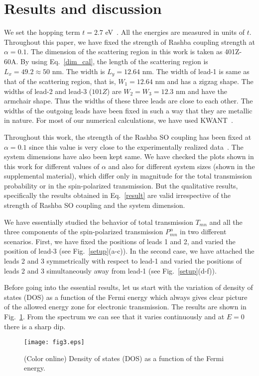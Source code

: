 \documentclass[prb,aps,twocolumn,amsmath,amssymb,floatfix,
superscriptaddress]{revtex4}
\begin{document}
\section{{\label{randd}}Results and discussion}

We set the hopping term $t=2.7$ eV~{\cite{neto}}. All the
energies are measured in units of $t$. Throughout this paper, we have
fixed the strength of Rashba coupling strength at $\alpha=0.1$. The
dimension of the scattering region in this work is taken as
401Z-60A. By using Eq.~\ref{dim_cal}, the length of the scattering
region is $L_x =49.2\approx 50$ nm. The width is $L_y=12.64$ nm. The
width of lead-1 is same as that of the scattering region, that is,
$W_1=12.64$ nm and has a zigzag shape. The widths of lead-2 and lead-3
($101Z$) are $W_2=W_3=12.3$ nm and have the armchair shape. Thus the
widths of these three leads are close to each other. The widths of the
outgoing leads have been fixed in such a way that they are metallic in
nature. For most of our numerical calculations, we have used
KWANT~\cite{kwant}.

Throughout this work, the strength of the Rashba SO coupling has been
fixed at $\alpha=0.1$ since this value is very close to the
experimentally realized data~{\cite{dedcov}}. The system dimensions have
also been kept same. We have checked the plots shown in this work for
different values of $\alpha$ and also for different system sizes
(shown in the supplemental material), which differ only in
magnitude for the total transmission probability or in the
spin-polarized transmission. But the qualitative results, specifically
the results obtained in Eq.~{\ref{result}} are valid irrespective of the
strength of Rashba SO coupling and the system dimension.

We have essentially studied the behavior of total transmission $T_{mn}$ and all
the three components of the spin-polarized transmission
$P^\alpha_{mn}$ in two different scenarios. First, we have fixed the
positions of leads 1 and 2, and varied the position of lead-3 (see
Fig.~\ref{setup}(a-c)). In the second case, we have attached the leads
2 and 3 symmetrically with respect to lead-1 and varied the positions
of leads 2 and 3 simultaneously away from lead-1 (see
Fig.~\ref{setup}(d-f)).

Before going into the essential results, let us start with the
  variation of density of states (DOS) as a function of the Fermi
  energy which always gives clear picture of the allowed energy zone for electronic transmission. The results are shown in Fig.~{\ref{dos}}. From the spectrum
  we can see that it varies continuously and at $E=0$ there is a sharp
  dip.
\begin{figure}[h]
\centering
\texttt{[image: fig3.eps]}
\caption{(Color online) Density of states (DOS) as a function of the
  Fermi energy.}
\label{dos}
\end{figure}
\end{document}
